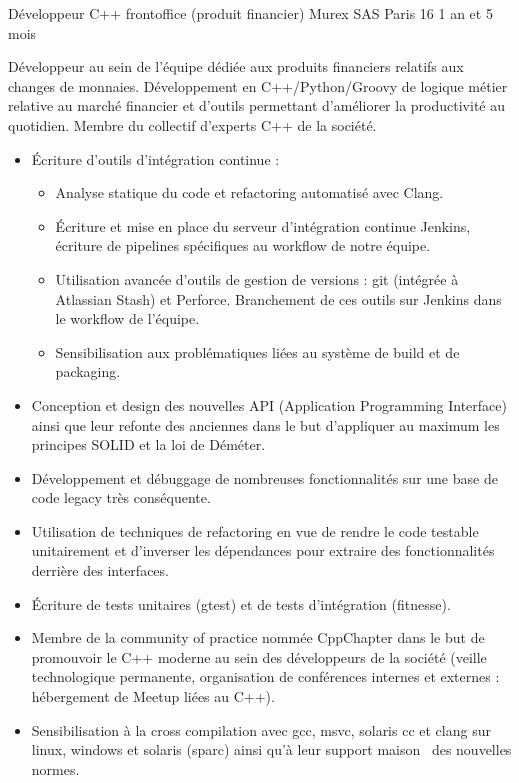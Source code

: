 \documentclass[11pt,a4paper,sans]{moderncv} %
\begin{document}
{Développeur C++ frontoffice (produit financier)}
{Murex SAS}
{Paris 16}
{1 an et 5 mois}
{Développeur au sein de l'équipe dédiée aux produits financiers relatifs aux changes de monnaies. Développement en C++/Python/Groovy de logique métier relative au marché financier et d'outils permettant d'améliorer la productivité au quotidien. Membre du collectif d'experts C++ de la société.
	\begin{itemize}
		\item Écriture d'outils d'intégration continue :
		      \begin{itemize}
			      \item Analyse statique du code et refactoring automatisé avec Clang.
			      \item Écriture et mise en place du serveur d'intégration continue Jenkins, écriture de pipelines spécifiques au workflow de notre équipe.
			      \item Utilisation avancée d'outils de gestion de versions : git (intégrée à Atlassian Stash) et Perforce. Branchement de ces outils sur Jenkins dans le workflow de l'équipe.
			      \item Sensibilisation aux problématiques liées au système de build et de packaging.
		      \end{itemize}
		\item Conception et design des nouvelles API (Application Programming Interface) ainsi que leur refonte des anciennes dans le but d'appliquer au maximum les principes SOLID et la loi de Déméter.
		\item Développement et débuggage de nombreuses fonctionnalités sur une base de code legacy très conséquente.
		\item Utilisation de techniques de refactoring en vue de rendre le code testable unitairement et d'inverser les dépendances pour extraire des fonctionnalités derrière des interfaces.
		\item Écriture de tests unitaires (gtest) et de tests d'intégration (fitnesse).
		\item Membre de la \og community of practice \fg nommée CppChapter dans le but de promouvoir le C++ moderne au sein des développeurs de la société (veille technologique permanente, organisation de conférences internes et externes : hébergement de Meetup liées au C++).
		\item Sensibilisation à la cross compilation avec gcc, msvc, solaris cc et clang sur linux, windows et solaris (sparc) ainsi qu'à leur support \og maison \fg ~des nouvelles normes.
	\end{itemize}}
\end{document}
